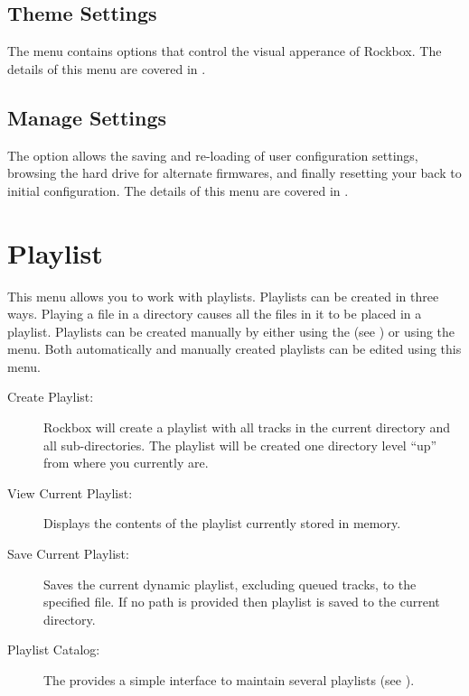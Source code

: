\subsection{Theme Settings}
The  menu contains options that control the visual
apperance of Rockbox. The details of this menu are covered in
.


\subsection{Manage Settings}
The  option allows the saving and re-loading of user 
configuration settings, browsing the hard drive for alternate firmwares, and finally
resetting your \dap{} back to initial configuration.
%
The details of this menu are covered in
.



\section{\label{ref:playlistoptions}Playlist}
  This menu allows you to work with playlists. Playlists can be created in 
  three ways. Playing a file in a directory causes all the files in it
  to be placed in a playlist. Playlists can be created manually by
  either using the   (see ) or using
  the  menu. Both automatically and manually created
  playlists can be edited using this menu.

\begin{description}
\item[Create Playlist:]
  Rockbox will create a playlist with all tracks in the current directory 
and all sub-directories. The playlist will be created one directory level ``up'' 
from where you currently are.
  
\item[View Current Playlist:]
  Displays the contents of the playlist currently stored in memory.
  
\item[Save Current Playlist:]
  Saves the current dynamic playlist, excluding queued tracks, to the 
specified file. If no path is provided then playlist is saved to the current 
directory.

\item[Playlist Catalog:]
  The  provides a simple interface to maintain
  several playlists (see ).
\end{description}

